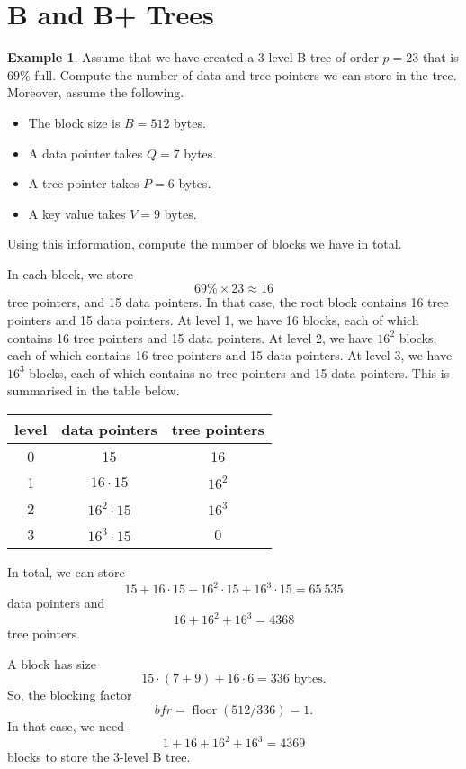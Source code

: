 \documentclass[a4paper, openany]{memoir}
\theoremstyle{definition}
\newtheorem{example}[subsection]{Example}
\begin{document}
\section{B and B+ Trees}
\begin{example}
  Assume that we have created a 3-level B tree of order $p = 23$ that is $69\%$ full.  Compute the number of data and tree pointers we can store in the tree. Moreover, assume the following.
  \begin{itemize}
      \item The block size is $B = 512$ bytes.
      \item A data pointer takes $Q = 7$ bytes.
      \item A tree pointer takes $P = 6$ bytes.
      \item A key value takes $V = 9$ bytes.   
  \end{itemize}
  Using this information, compute the number of blocks we have in total.
\end{example}
\begin{answer}
    In each block, we store
    \[69\% \times 23 \approx 16\]
    tree pointers, and 15 data pointers. In that case, the root block contains 16 tree pointers and 15 data pointers. At level 1, we have 16 blocks, each of which contains 16 tree pointers and 15 data pointers. At level 2, we have $16^2$ blocks, each of which contains 16 tree pointers and 15 data pointers. At level 3, we have $16^3$ blocks, each of which contains no tree pointers and 15 data pointers. This is summarised in the table below.
    \begin{table}[H]
        \centering
        \begin{tabular}{|c|c|c|}
            \hline
            level & data pointers & tree pointers \\
            \hline
            0 & 15 & 16 \\
            1 & $16 \cdot 15$ & $16^2$ \\
            2 & $16^2 \cdot 15$ & $16^3$ \\
            3 & $16^3 \cdot 15$ & 0 \\
            \hline
        \end{tabular}
    \end{table}
    In total, we can store 
    \[15 + 16 \cdot 15 + 16^2 \cdot 15 + 16^3 \cdot 15 = 65 \ 535\]
    data pointers and 
    \[16 + 16^2 + 16^3 = 4368\]
    tree pointers. 

    A block has size
    \[15 \cdot (7 + 9) + 16 \cdot 6 = 336 \text{ bytes}.\]
    So, the blocking factor 
    \[\textit{bfr} = \operatorname{floor}(512/336) = 1.\]
    In that case, we need 
    \[1 + 16 + 16^2 + 16^3 = 4369\]
    blocks to store the 3-level B tree.
\end{answer}
\end{document}
